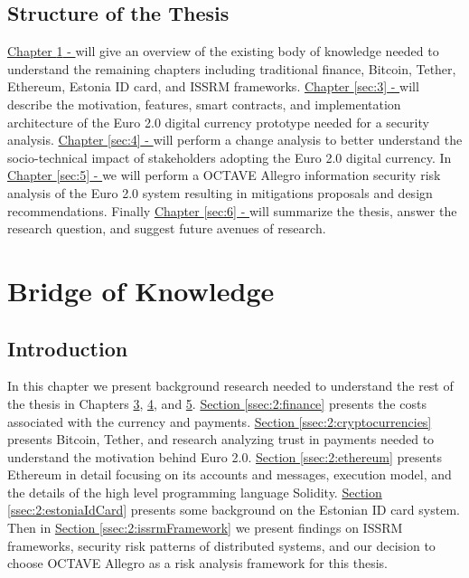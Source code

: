 \documentclass[a4paper,12pt]{article} %
\newcommand{\hypersectionref}[1]{\hyperref[#1]{Section \ref{#1}}}
\newcommand{\hyperchapterref}[1]{\hyperref[#1]{Chapter \ref{#1} - \nameref{#1}}}
\begin{document}
\subsection{Structure of the Thesis} \label{ssec:1.4}

\hyperchapterref{sec:2} will give an overview of the existing body of knowledge needed to understand the remaining chapters including traditional finance, Bitcoin, Tether, Ethereum, Estonia ID card, and ISSRM frameworks. \hyperchapterref{sec:3} will describe the motivation, features, smart contracts, and implementation architecture of the Euro 2.0 digital currency prototype needed for a security analysis. \hyperchapterref{sec:4} will perform a change analysis to better understand the socio-technical impact of stakeholders adopting the Euro 2.0 digital currency. In \hyperchapterref{sec:5} we will perform a OCTAVE Allegro information security risk analysis of the Euro 2.0 system resulting in mitigations proposals and design recommendations. Finally \hyperchapterref{sec:6} will summarize the thesis, answer the research question, and suggest future avenues of research.

\pagebreak

\section{Bridge of Knowledge} \label{sec:2}

\subsection{Introduction} \label{ssec:2:introduction}

In this chapter we present background research needed to understand the rest of the thesis in Chapters \hyperref[sec:3]{3}, \hyperref[sec:4]{4}, and \hyperref[sec:5]{5}. \hypersectionref{ssec:2:finance} presents the costs associated with the currency and payments. \hypersectionref{ssec:2:cryptocurrencies} presents Bitcoin, Tether, and research analyzing trust in payments needed to understand the motivation behind Euro 2.0. \hypersectionref{ssec:2:ethereum} presents Ethereum in detail focusing on its accounts and messages, execution model, and the details of the high level programming language Solidity. \hypersectionref{ssec:2:estoniaIdCard} presents some background on the Estonian ID card system. Then in \hypersectionref{ssec:2:issrmFramework} we present findings on ISSRM frameworks, security risk patterns of distributed systems, and our decision to choose OCTAVE Allegro as a risk analysis framework for this thesis.
\end{document}
